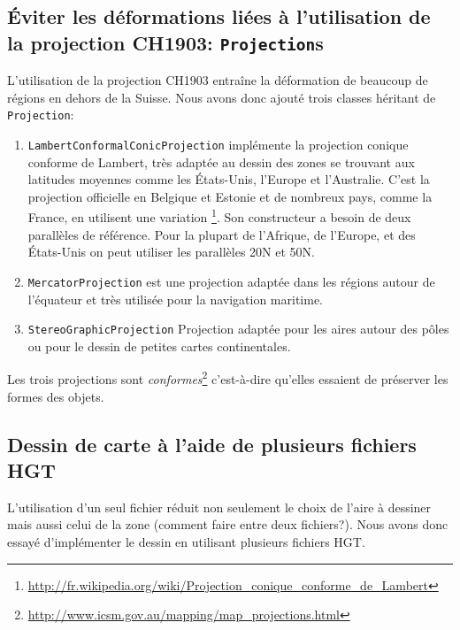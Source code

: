\documentclass[11pt,a4paper]{article}
\begin{document}
\subsection{Éviter les déformations liées à l'utilisation de la projection CH1903: \texttt{Projection}s}
L'utilisation de la projection CH1903 entraîne la déformation de beaucoup de régions en dehors de la Suisse. Nous avons donc ajouté trois classes héritant de \texttt{Projection}:
\begin{enumerate}
    \item \texttt{LambertConformalConicProjection} implémente la projection conique conforme de Lambert, très adaptée au dessin des zones se trouvant aux latitudes moyennes comme les États-Unis, l'Europe et l'Australie. C'est la projection officielle en Belgique et Estonie et de nombreux pays, comme la France, en utilisent une variation \footnote{\url{http://fr.wikipedia.org/wiki/Projection_conique_conforme_de_Lambert}}. Son constructeur a besoin de deux parallèles de référence. Pour la plupart de l'Afrique, de l'Europe, et des États-Unis on peut utiliser les parallèles 20\degre N et 50\degre N. 
    \item \texttt{MercatorProjection} est une projection adaptée dans les régions autour de l'équateur et très utilisée pour la navigation maritime.
    \item \texttt{StereoGraphicProjection} Projection adaptée pour les aires autour des pôles ou pour le dessin de petites cartes continentales.
\end{enumerate}
Les trois projections sont \textit{conformes}\footnote{\url{http://www.icsm.gov.au/mapping/map_projections.html}} c'est-à-dire qu'elles essaient de préserver les formes des objets.

\subsection{Dessin de carte à l'aide de plusieurs fichiers HGT}
L'utilisation d'un seul fichier réduit non seulement le choix de l'aire à dessiner mais aussi celui de la zone (comment faire entre deux fichiers?). Nous avons donc essayé d'implémenter le dessin en utilisant plusieurs fichiers HGT.
\end{document}
